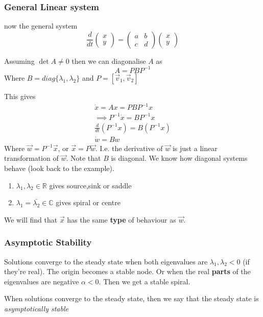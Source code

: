 \documentclass{/home/janmebows/Documents/LatexTemplates/myassignment}
\begin{document}
\subsubsection{General Linear system}
now the general system
\[\frac{d}{dt} \begin{pmatrix}
    x\\y
\end{pmatrix} = \begin{pmatrix}
a&b\\c&d
\end{pmatrix} \begin{pmatrix}
    x\\y
\end{pmatrix}\]

Assuming $\det A\neq 0$ then we can diagonalise $A$ as
\[A = PBP^{-1}\]
Where $B = diag\{\lambda_1,\lambda_2\}$ and $P = [\vec v_1,\vec v_2]$ 

This gives
\begin{align*}
    \dot x = Ax = PBP^{-1} x\\
    \implies P^{-1} \dot x = BP^{-1} x\\
    \frac{d}{dt}(P^{-1} x) = B (P^{-1} x)\\
    \dot w = B w
\end{align*}
Where $\vec w = P^{-1} \vec x$, or $\vec x = P\vec w$. I.e. the derivative of $\vec w$ is just a linear transformation of $\vec w$.
Note that $B$ is diagonal. We know how diagonal systems behave (look back to the example). 

\begin{enumerate}
    \item $\lambda_1,\lambda_2 \in \mathbb{R}$ gives source,sink or saddle
    \item $\lambda_1 = \bar{\lambda_2} \in \mathbb{C}$ gives spiral or centre
\end{enumerate}

We will find that $\vec x$ has the same \textbf{type} of behaviour as $\vec w$.


\subsubsection{Asymptotic Stability}
Solutions converge to the steady state when both eigenvalues are $\lambda_1,\lambda_2 < 0$ (if they're real). The origin becomes a stable node.
Or when the real \textbf{parts} of the eigenvalues are negative $\alpha <0$. Then we get a stable spiral.

When solutions converge to the steady state, then we say that the steady state is \textit{asymptotically stable}
\end{document}
